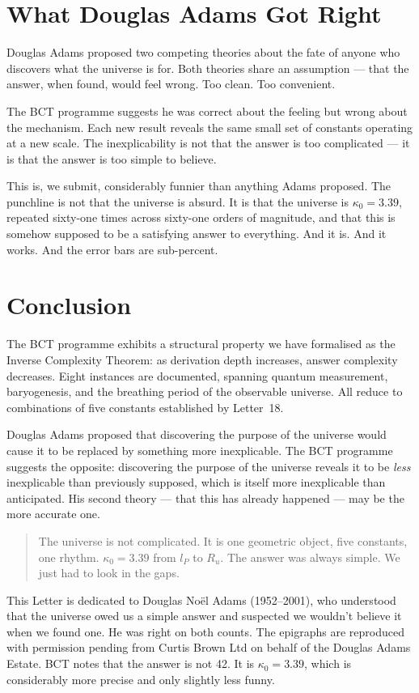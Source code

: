 \documentclass[aps,prl,twocolumn,superscriptaddress,floatfix]{revtex4-2}
\begin{document}
\section{What Douglas Adams Got Right}

Douglas Adams proposed two competing theories about the fate of
anyone who discovers what the universe is for. Both theories
share an assumption --- that the answer, when found, would feel
wrong. Too clean. Too convenient.

The BCT programme suggests he was correct about the feeling but
wrong about the mechanism. Each new result reveals the same small
set of constants operating at a new scale. The inexplicability
is not that the answer is too complicated --- it is that the
answer is too simple to believe.

This is, we submit, considerably funnier than anything Adams
proposed. The punchline is not that the universe is absurd.
It is that the universe is $\kappa_0 = 3.39$, repeated
sixty-one times across sixty-one orders of magnitude,
and that this is somehow supposed to be a satisfying answer
to everything. And it is. And it works. And the error bars
are sub-percent.

\section{Conclusion}

The BCT programme exhibits a structural property we have
formalised as the Inverse Complexity Theorem: as derivation
depth increases, answer complexity decreases. Eight instances
are documented, spanning quantum measurement, baryogenesis,
and the breathing period of the observable universe. All reduce
to combinations of five constants established by Letter~18.

Douglas Adams proposed that discovering the purpose of the
universe would cause it to be replaced by something more
inexplicable. The BCT programme suggests the opposite:
discovering the purpose of the universe reveals it to be
\textit{less} inexplicable than previously supposed,
which is itself more inexplicable than anticipated.
His second theory --- that this has already happened ---
may be the more accurate one.

\begin{quotation}
The universe is not complicated. It is one geometric object,
five constants, one rhythm. $\kappa_0 = 3.39$ from $l_P$
to $R_u$. The answer was always simple. We just had to
look in the gaps.
\end{quotation}

\begin{acknowledgments}
This Letter is dedicated to Douglas No\"{e}l Adams (1952--2001),
who understood that the universe owed us a simple answer and
suspected we wouldn't believe it when we found one.
He was right on both counts.
The epigraphs are reproduced with permission pending from
Curtis Brown Ltd on behalf of the Douglas Adams Estate.
BCT notes that the answer is not 42. It is $\kappa_0 = 3.39$,
which is considerably more precise and only slightly less funny.
\end{acknowledgments}
\end{document}

